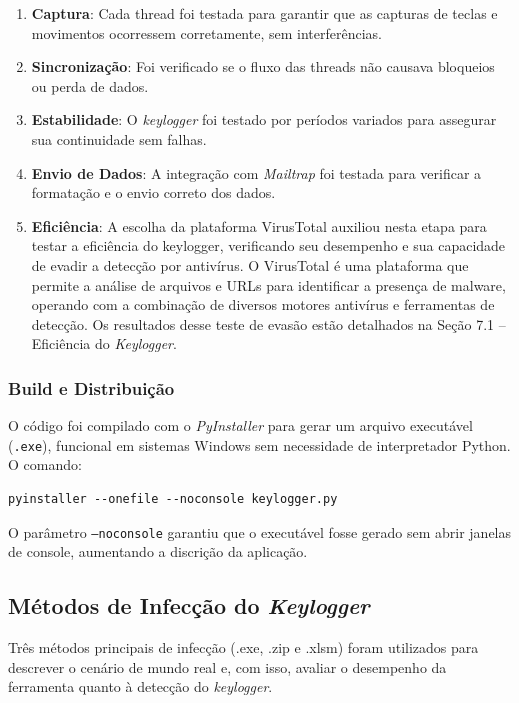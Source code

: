 \documentclass[12pt]{article}
\begin{document}
\begin{enumerate}
    \item \textbf{Captura}: Cada thread foi testada para garantir que as capturas de teclas e movimentos ocorressem corretamente, sem interferências.
    \item \textbf{Sincronização}: Foi verificado se o fluxo das threads não causava bloqueios ou perda de dados.
    \item \textbf{Estabilidade}: O \textit{keylogger} foi testado por períodos variados para assegurar sua continuidade sem falhas.
    \item \textbf{Envio de Dados}: A integração com \textit{Mailtrap} foi testada para verificar a formatação e o envio correto dos dados.
    \item \textbf{Eficiência}: A escolha da plataforma VirusTotal auxiliou nesta 
    etapa para testar a eficiência do keylogger, verificando seu desempenho e 
    sua capacidade de evadir a detecção por antivírus. O VirusTotal é uma plataforma 
    que permite a análise de arquivos e URLs para identificar a presença de malware, 
    operando com a combinação de diversos motores antivírus e ferramentas de detecção.
    Os resultados desse teste de evasão estão detalhados na Seção 7.1 – Eficiência do \textit{Keylogger}.
\end{enumerate}

\subsubsection{Build e Distribuição}

O código foi compilado com o \textit{PyInstaller} para gerar um arquivo executável (\texttt{.exe}), funcional em sistemas Windows sem necessidade de interpretador Python. O comando:

\begin{verbatim} 
pyinstaller --onefile --noconsole keylogger.py 
\end{verbatim}

O parâmetro \texttt{--noconsole} garantiu que o executável fosse gerado sem abrir janelas de console, aumentando a discrição da aplicação.

\subsection{Métodos de Infecção do \textit{Keylogger}}
Três métodos principais de infecção (.exe, .zip e .xlsm) 
foram utilizados para descrever o cenário de mundo real e, com isso, 
avaliar o desempenho da ferramenta quanto à detecção do \textit{keylogger}.
\end{document}
